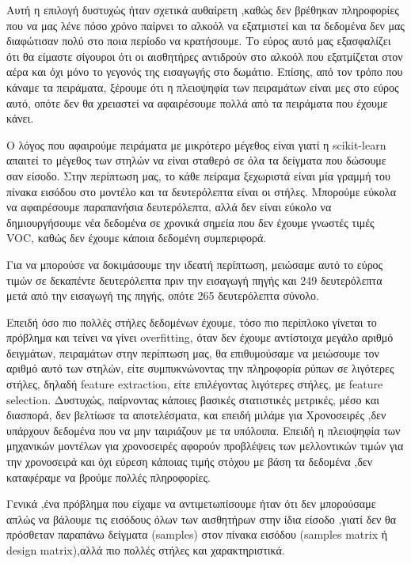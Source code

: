 Αυτή η επιλογή δυστυχώς ήταν σχετικά αυθαίρετη ,καθώς δεν βρέθηκαν πληροφορίες που να μας λένε πόσο χρόνο παίρνει το αλκοόλ να εξατμιστεί
και τα δεδομένα δεν μας διαφώτισαν πολύ στο ποια περίοδο να κρατήσουμε.
Το εύρος αυτό μας εξασφαλίζει ότι θα είμαστε σίγουροι ότι οι αισθητήρες αντιδρούν στο αλκοόλ που εξατμίζεται στον αέρα
και όχι μόνο το γεγονός της εισαγωγής στο δωμάτιο.
Επίσης, από τον τρόπο που κάναμε τα πειράματα, ξέρουμε ότι η πλειοψηφία των πειραμάτων είναι μες στο εύρος αυτό, οπότε δεν θα χρειαστεί
να αφαιρέσουμε πολλά από τα πειράματα που έχουμε κάνει.

Ο λόγος που αφαιρούμε πειράματα με μικρότερο μέγεθος είναι γιατί η scikit-learn απαιτεί το μέγεθος των στηλών να είναι σταθερό
σε όλα τα δείγματα που δώσουμε σαν είσοδο.
Στην περίπτωση μας, το κάθε πείραμα ξεχωριστά είναι μία γραμμή του πίνακα εισόδου στο μοντέλο και τα δευτερόλεπτα είναι οι στήλες.
Μπορούμε εύκολα να αφαιρέσουμε παραπανήσια δευτερόλεπτα, αλλά δεν είναι εύκολο να δημιουργήσουμε νέα δεδομένα σε χρονικά σημεία 
που δεν έχουμε γνωστές τιμές VOC, καθώς δεν έχουμε κάποια δεδομένη συμπεριφορά.

Για να μπορούσε να δοκιμάσουμε την ιδεατή περίπτωση, μειώσαμε αυτό το εύρος τιμών σε δεκαπέντε δευτερόλεπτα πριν την εισαγωγή πηγής
και 249 δευτερόλεπτα μετά από την εισαγωγή της πηγής,  οπότε 265 δευτερόλεπτα σύνολο.

Επειδή όσο πιο πολλές στήλες δεδομένων έχουμε, τόσο πιο περίπλοκο γίνεται το πρόβλημα και τείνει να γίνει overfitting,
όταν δεν έχουμε αντίστοιχα μεγάλο αριθμό δειγμάτων, πειραμάτων  στην περίπτωση μας, θα επιθυμούσαμε 
να μειώσουμε τον αριθμό αυτό των στηλών, είτε συμπυκνώνοντας την πληροφορία ρύπων σε λιγότερες στήλες, δηλαδή feature extraction,
είτε επιλέγοντας λιγότερες στήλες, με feature selection.
Δυστυχώς, παίρνοντας κάποιες βασικές στατιστικές μετρικές, μέσο και διασπορά, δεν βελτίωσε τα αποτελέσματα, και επειδή μιλάμε για 
Χρονοσειρές ,δεν υπάρχουν δεδομένα που να μην ταιριάζουν με τα υπόλοιπα.
Επειδή η πλειοψηφία των μηχανικών μοντέλων για χρονοσειρές αφορούν προβλέψεις των μελλοντικών τιμών για την χρονοσειρά 
και όχι εύρεση κάποιας τιμής στόχου με βάση τα δεδομένα ,δεν καταφέραμε να βρούμε πολλές πληροφορίες.

Γενικά ,ένα πρόβλημα που είχαμε να αντιμετωπίσουμε ήταν ότι δεν μπορούσαμε απλώς να βάλουμε τις εισόδους όλων των αισθητήρων
στην ίδια είσοδο ,γιατί δεν θα πρόσθεταν παραπάνω δείγματα (samples) στον πίνακα εισόδου (samples matrix ή design matrix),αλλά
πιο πολλές στήλες και χαρακτηριστικά.

